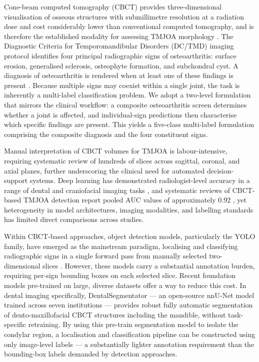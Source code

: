 \documentclass[review,12pt]{elsarticle}
\begin{document}
Cone-beam computed tomography (CBCT) provides three-dimensional
visualisation of osseous structures with submillimetre resolution at a
radiation dose and cost considerably lower than conventional computed
tomography, and is therefore the established modality for assessing
TMJOA morphology \cite{larheim2015temporomandibular,honey2007accuracy}.
The Diagnostic Criteria for Temporomandibular Disorders (DC/TMD) imaging
protocol identifies four principal radiographic signs of osteoarthritis:
surface erosion, generalised sclerosis, osteophyte formation, and
subchondral cyst. A diagnosis of osteoarthritis is rendered when at
least one of these findings is present
\cite{schiffman2014diagnostic}. Because multiple signs may coexist
within a single joint, the task is inherently a multi-label
classification problem. We adopt a two-level formulation that mirrors
the clinical workflow: a composite osteoarthritis screen determines
whether a joint is affected, and individual-sign predictions then
characterise which specific findings are present. This yields a
five-class multi-label formulation comprising the composite diagnosis and
the four constituent signs.

Manual interpretation of CBCT volumes for TMJOA is labour-intensive,
requiring systematic review of hundreds of slices across sagittal,
coronal, and axial planes, further underscoring the clinical need for
automated decision-support systems. Deep learning has demonstrated
radiologist-level accuracy in a range of dental and craniofacial imaging
tasks \cite{chen2019deep, choi2021artificial,talaat2023artificial}, and systematic
reviews of CBCT-based TMJOA detection report pooled AUC values of
approximately 0.92 \cite{xu2023artificial},
yet heterogeneity in model architectures, imaging modalities, and
labelling standards has limited direct comparisons across studies.

Within CBCT-based approaches, object detection models, particularly the YOLO family, have emerged as the mainstream paradigm, localising and classifying radiographic signs in a single forward pass from manually selected two-dimensional slices \cite{lee2020automated, talaat2023artificial,Mao2025}. However, these models carry a substantial annotation burden, requiring per-sign bounding boxes on each selected slice. Recent foundation models pre-trained on large, diverse datasets offer a way to reduce this cost. In dental imaging specifically, DentalSegmentator \cite{dot2024dentalsegmentator} — an open-source nnU-Net model trained across seven institutions — provides robust fully automatic segmentation of dento-maxillofacial CBCT structures including the mandible, without task-specific retraining. By using this pre-train segmentation model to isolate the condylar region, a localisation and classification pipeline can be constructed using only image-level labels — a substantially lighter annotation requirement than the bounding-box labels demanded by detection approaches.
\end{document}
